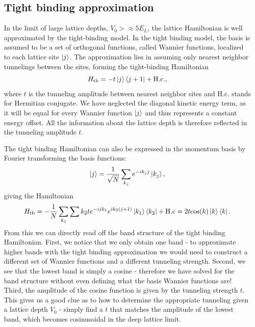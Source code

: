 \subsection{Tight binding approximation}\label{sec:tightBinding}

In the limit of large lattice depths, $V_0 > \approx 5 E_L$, the lattice Hamiltonian is well approximated by the tight-binding model. In the tight binding model, the basis is assumed to be a set of orthogonal functions, called Wannier functions, localized to each lattice site $\mathinner{|{j}\rangle}$.  The approximation lies in assuming only nearest neighbor tunnelings between the sites, forming the tight-binding Hamiltonian
\begin{equation}
H_{\rm tb} = - t \mathinner{|{j}\rangle}\mathinner{\langle{j+1}|} + {\rm H.c.},
\end{equation}
where $t$ is the tunneling amplitude between nearest neighbor sites and H.c. stands for Hermitian conjugate. We have neglected the diagonal kinetic energy term, as it will be equal for every Wannier function $\mathinner{|{j}\rangle}$ and thus represents a constant energy offset. All the information about the lattice depth is therefore reflected in the tunneling amplitude $t$. 

The tight binding Hamiltonian can also be expressed in the momentum basis by Fourier transforming the basis functions:
\begin{equation}
\mathinner{|{j}\rangle} = \frac{1}{\sqrt{N}}\sum_{k_j} e^{-i k_j j}\mathinner{|{k_j}\rangle},
\end{equation}
giving the Hamiltonian
\begin{equation}
H_{\rm tb} = - \frac{1}{N}\sum_{k_1}\sum{k_2} t e^{-i j k_1} e^{i k_2 (j+1)} \mathinner{|{k_1}\rangle}\mathinner{\langle{k_2}|} + {\rm H.c} = 2 t {\rm cos}(k)\mathinner{|{k}\rangle}\mathinner{\langle{k}|}.
\end{equation}  
From this we can directly read off the band structure of the tight binding Hamiltonian. First, we notice that we only obtain one band - to approximate higher bands with the tight binding approximation we would need to construct a different set of Wannier functions and a different tunneling strength. Second, we see that the lowest band is simply a cosine - therefore we have solved for the band structure without even defining what the basis Wannier functions are! Third, the amplitude of the cosine function is given by the tunneling strength $t$. This gives us a good clue as to how to determine the appropriate tunneling given a lattice depth $V_0$ - simply find a $t$ that matches the amplitude of the lowest band, which becomes cosinusoidal in the deep lattice limit. 

